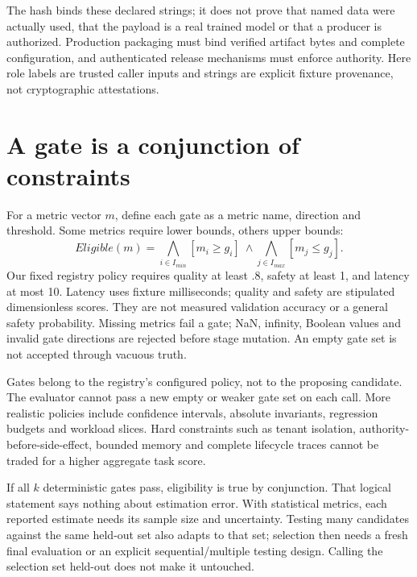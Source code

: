 
The hash binds these declared strings; it does not prove that named data were
actually used, that the payload is a real trained model or that a producer is
authorized. Production packaging must bind verified artifact bytes and complete
configuration, and authenticated release mechanisms must enforce authority.
Here role labels are trusted caller inputs and strings are explicit fixture
provenance, not cryptographic attestations.

\section{A gate is a conjunction of constraints}
\label{evod43:gates}
For a metric vector $m$, define each gate as a metric name, direction and
threshold. Some metrics require lower bounds, others upper bounds:
\[
 Eligible(m)=\bigwedge_{i\in I_{min}}[m_i\ge g_i]
 \ \wedge\!\bigwedge_{j\in I_{max}}[m_j\le g_j].
\]
Our fixed registry policy requires quality at least .8, safety at least 1,
and latency at most 10. Latency uses fixture milliseconds; quality and safety
are stipulated dimensionless scores. They are not measured validation accuracy
or a general safety probability. Missing metrics fail a gate; NaN, infinity,
Boolean values and invalid gate directions are rejected before stage mutation.
An empty gate set is not accepted through vacuous truth.

Gates belong to the registry's configured policy, not to the proposing candidate.
The evaluator cannot pass a new empty or weaker gate set on each call.
More realistic policies include confidence intervals, absolute invariants,
regression budgets and workload slices. Hard constraints such as tenant
isolation, authority-before-side-effect, bounded memory and complete lifecycle
traces cannot be traded for a higher aggregate task score.

If all $k$ deterministic gates pass, eligibility is true by conjunction.
That logical statement says nothing about estimation error. With statistical
metrics, each reported estimate needs its sample size and uncertainty. Testing
many candidates against the same held-out set also adapts to that set;
selection then needs a fresh final evaluation or an explicit sequential/multiple
testing design. Calling the selection set held-out does not make it untouched.

